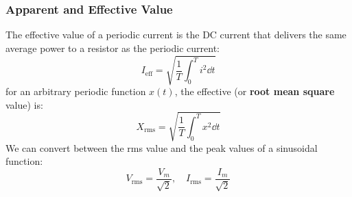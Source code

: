 \documentclass{article}
\begin{document}
\subsubsection{Apparent and Effective Value}
The effective value of a periodic current is the DC current that delivers the same average power to a resistor as the periodic current:
\begin{equation}
    I_\text{eff} = \sqrt{\frac{1}{T}\int_0^T i^2 \dd{t}}
\end{equation}
for an arbitrary periodic function $x(t)$, the effective (or \textbf{root mean square} value) is:
\begin{equation}
    X_\text{rms} = \sqrt{\frac{1}{T}\int_0^T x^2 \dd{t}}
\end{equation}
We can convert between the rms value and the peak values of a sinusoidal function:
\begin{equation}
    V_\text{rms} = \frac{V_m}{\sqrt{2}},\quad I_\text{rms} = \frac{I_m}{\sqrt{2}}
\end{equation}
\end{document}

